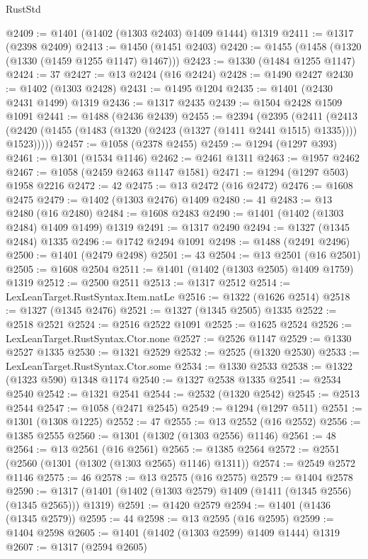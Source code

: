 \begin{lexlean}{RustStd}
\begin{coremodule}
@2409 := @1401 (@1402 (@1303 @2403) @1409 @1444) @1319
@2411 := @1317 (@2398 @2409)
@2413 := @1450 (@1451 @2403)
@2420 := @1455 (@1458 (@1320 (@1330 (@1459 @1255 @1147) @1467)))
@2423 := @1330 (@1484 @1255 @1147)
@2424 := 37
@2427 := @13 @2424 (@16 @2424)
@2428 := @1490 @2427
@2430 := @1402 (@1303 @2428)
@2431 := @1495 @1204
@2435 := @1401 (@2430 @2431 @1499) @1319
@2436 := @1317 @2435
@2439 := @1504 @2428 @1509 @1091
@2441 := @1488 (@2436 @2439)
@2455 := @2394
    (@2395
      (@2411
        (@2413 (@2420 (@1455 (@1483 (@1320 (@2423 (@1327 (@1411 @2441 @1515) @1335)))) @1523)))))
@2457 := @1058 (@2378 @2455)
@2459 := @1294 (@1297 @393)
@2461 := @1301 (@1534 @1146)
@2462 := @2461 @1311
@2463 := @1957 @2462
@2467 := @1058 (@2459 @2463 @1147 @1581)
@2471 := @1294 (@1297 @503) @1958 @2216
@2472 := 42
@2475 := @13 @2472 (@16 @2472)
@2476 := @1608 @2475
@2479 := @1402 (@1303 @2476) @1409
@2480 := 41
@2483 := @13 @2480 (@16 @2480)
@2484 := @1608 @2483
@2490 := @1401 (@1402 (@1303 @2484) @1409 @1499) @1319
@2491 := @1317 @2490
@2494 := @1327 (@1345 @2484) @1335
@2496 := @1742 @2494 @1091
@2498 := @1488 (@2491 @2496)
@2500 := @1401 (@2479 @2498)
@2501 := 43
@2504 := @13 @2501 (@16 @2501)
@2505 := @1608 @2504
@2511 := @1401 (@1402 (@1303 @2505) @1409 @1759) @1319
@2512 := @2500 @2511
@2513 := @1317 @2512
@2514 := LexLeanTarget.RustSyntax.Item.natLe
@2516 := @1322 (@1626 @2514)
@2518 := @1327 (@1345 @2476)
@2521 := @1327 (@1345 @2505) @1335
@2522 := @2518 @2521
@2524 := @2516 @2522 @1091
@2525 := @1625 @2524
@2526 := LexLeanTarget.RustSyntax.Ctor.none
@2527 := @2526 @1147
@2529 := @1330 @2527 @1335
@2530 := @1321 @2529
@2532 := @2525 (@1320 @2530)
@2533 := LexLeanTarget.RustSyntax.Ctor.some
@2534 := @1330 @2533
@2538 := @1322 (@1323 @590) @1348 @1174
@2540 := @1327 @2538 @1335
@2541 := @2534 @2540
@2542 := @1321 @2541
@2544 := @2532 (@1320 @2542)
@2545 := @2513 @2544
@2547 := @1058 (@2471 @2545)
@2549 := @1294 (@1297 @511)
@2551 := @1301 (@1308 @1225)
@2552 := 47
@2555 := @13 @2552 (@16 @2552)
@2556 := @1385 @2555
@2560 := @1301 (@1302 (@1303 @2556) @1146)
@2561 := 48
@2564 := @13 @2561 (@16 @2561)
@2565 := @1385 @2564
@2572 := @2551 (@2560 (@1301 (@1302 (@1303 @2565) @1146) @1311))
@2574 := @2549 @2572 @1146
@2575 := 46
@2578 := @13 @2575 (@16 @2575)
@2579 := @1404 @2578
@2590 := @1317 (@1401 (@1402 (@1303 @2579) @1409 (@1411 (@1345 @2556) (@1345 @2565))) @1319)
@2591 := @1420 @2579
@2594 := @1401 (@1436 (@1345 @2579))
@2595 := 44
@2598 := @13 @2595 (@16 @2595)
@2599 := @1404 @2598
@2605 := @1401 (@1402 (@1303 @2599) @1409 @1444) @1319
@2607 := @1317 (@2594 @2605)

\end{coremodule}
\end{lexlean}
